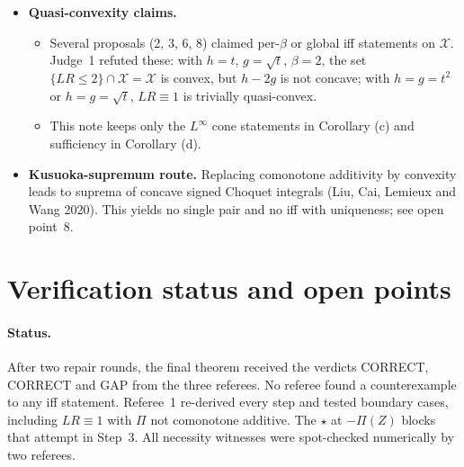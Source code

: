 \begin{itemize}
  \begin{itemize}
  \item Under (M), F1's mediant inequality implies additivity for comonotone pairs strictly on the same side of break-even.
  \item Pairs straddling $1$, and pairs through $N$, are not covered; see open point~2.
  \item The weighted identity (C) is globally valid. The inequality is false once a cash shift makes a premium negative.
  \end{itemize}
\item \textbf{Quasi-convexity claims.}
  \begin{itemize}
  \item Several proposals (2, 3, 6, 8) claimed per-$\beta$ or global iff statements on $\mathcal X$. Judge~1 refuted these: with $h=t$, $g=\sqrt t$, $\beta=2$, the set $\{LR\le2\}\cap\mathcal X=\mathcal X$ is convex, but $h-2g$ is not concave; with $h=g=t^2$ or $h=g=\sqrt t$, $LR\equiv1$ is trivially quasi-convex.
  \item This note keeps only the $L^\infty$ cone statements in Corollary (c) and sufficiency in Corollary (d).
  \end{itemize}
\item \textbf{Kusuoka-supremum route.} Replacing comonotone additivity by convexity leads to suprema of concave signed Choquet integrals (Liu, Cai, Lemieux and Wang 2020). This yields no single pair and no iff with uniqueness; see open point~8.
\end{itemize}

\section{Verification status and open points}

\paragraph{Status.} After two repair rounds, the final theorem received the verdicts CORRECT, CORRECT and GAP from the three referees. No referee found a counterexample to any iff statement. Referee~1 re-derived every step and tested boundary cases, including $LR\equiv1$ with $\Pi$ not comonotone additive. The $\star$ at $-\Pi(Z)$ blocks that attempt in Step~3. All necessity witnesses were spot-checked numerically by two referees.

